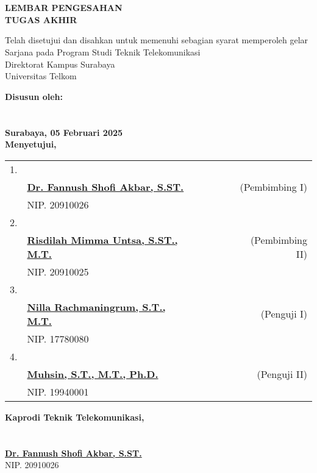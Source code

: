 \chapter*{}

    \begin{center}
    \textbf{LEMBAR PENGESAHAN}\\
	\vspace*{0.15 cm}
    \textbf{TUGAS AKHIR}\\

	\vspace*{0.15 cm}
	
	\textbf{\Judul}

	\vspace*{0.5 cm}
	
	Telah disetujui dan disahkan untuk memenuhi sebagian syarat memperoleh gelar\\ 
	Sarjana pada Program Studi Teknik Telekomunikasi \\
	Direktorat Kampus Surabaya\\
	Universitas Telkom

	\vspace*{0.5cm}
	\textbf{Disusun oleh:}\\
	\textbf{\Penulis} \\
	\textbf{\nim} \\
	
	\vspace*{0.5 cm}
		\textbf{Surabaya, 05 Februari 2025}\\
		\textbf{Menyetujui,}
	\end{center}

	\begin{tabular}{c l c c c c r}
		1. & & & \\
		& \textbf{\underline{Dr. Fannush Shofi Akbar, S.ST.}}& & & & & (Pembimbing I) \\
		& NIP. 20910026 & & & \\
		2.  & & & \\
		& \textbf{\underline{Risdilah Mimma Untsa, S.ST., M.T.}}& & & & &(Pembimbing II) \\
		& NIP. 20910025& & & \\
		3.  & & & \\
		& \textbf{\underline{Nilla Rachmaningrum, S.T., M.T.}}& & & & &(Penguji I) \\
		& NIP. 17780080& & & \\
		4.  & & & \\
		& \textbf{\underline{Muhsin, S.T., M.T., Ph.D.}}& & & & &(Penguji II) \\
		& NIP. 19940001& & & \\
	\end{tabular}
 
    \null\hfill \textbf{Kaprodi Teknik Telekomunikasi,}\\
	\\ \\
	\null\hspace{8.1cm}\textbf{\underline{Dr. Fannush Shofi Akbar, S.ST.}}\\
	\null\hspace{8.1cm}NIP. 20910026